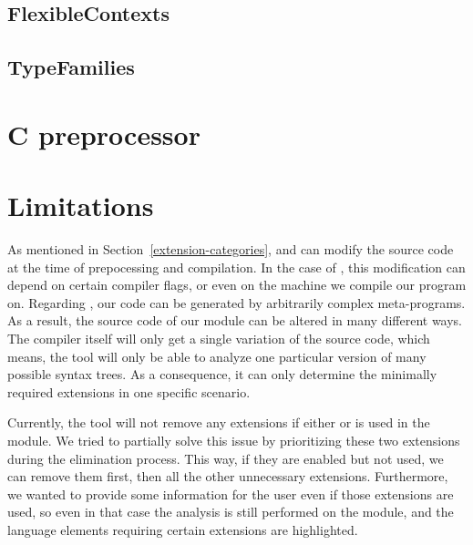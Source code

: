\documentclass[main.tex]{subfiles}
\begin{document}
	\subsection{FlexibleContexts} \label{flexible-contexts}
	
	
	\subsection{TypeFamilies}
	
	
	\section{C preprocessor}
	
	
	\section{Limitations}
	
	As mentioned in Section~\ref{extension-categories},  and  can modify the source code at the time of prepocessing and compilation. In the case of , this modification can depend on certain compiler flags, or even on the machine we compile our program on. Regarding , our code can be generated by arbitrarily complex meta-programs. As a result, the source code of our module can be altered in many different ways. The compiler itself will only get a single variation of the source code, which means, the tool will only be able to analyze one particular version of many possible syntax trees. As a consequence, it can only determine the minimally required extensions in one specific scenario.
	
	Currently, the tool will not remove any extensions if either  or  is used in the module. We tried to partially solve this issue by prioritizing these two extensions during the elimination process. This way, if they are enabled but not used, we can remove them first, then all the other unnecessary extensions. Furthermore, we wanted to provide some information for the user even if those extensions are used, so even in that case the analysis is still performed on the module, and the language elements requiring certain extensions are highlighted.
	
	
\end{document}
